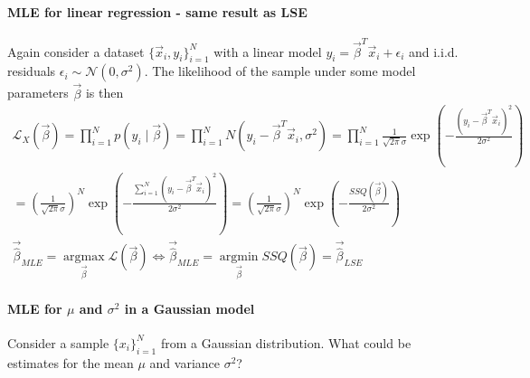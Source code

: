 \paragraph*{MLE for linear regression - same result as LSE} Again consider a dataset $\{ \vec{x}_i,y_i \}_{i=1}^N$
with a linear model $y_i = \vec{\beta}^T \vec{x}_i + \epsilon_i$ and i.i.d. residuals $\epsilon_i \sim \mathcal{N}(0,\sigma^2)$.
The likelihood of the sample under some model parameters $\vec{\beta}$ is then
\begin{equation}
    \begin{gathered}
    \mathcal{L}_X(\vec{\beta})=\prod_{i=1}^N p\left(y_i \mid \vec{\beta}\right)=\prod_{i=1}^N N\left(y_i-\vec{\beta}^T \vec{x}_i, \sigma^2\right)=\prod_{i=1}^N \frac{1}{\sqrt{2 \pi} \sigma} \exp \left(-\frac{\left(y_i-\vec{\beta}^T \vec{x}_i\right)^2}{2 \sigma^2}\right) \\
    =\left(\frac{1}{\sqrt{2 \pi} \sigma}\right)^N \exp \left(-\frac{\sum_{i=1}^N\left(y_i-\vec{\beta}^T \vec{x}_i\right)^2}{2 \sigma^2}\right)=\left(\frac{1}{\sqrt{2 \pi} \sigma}\right)^N \exp \left(-\frac{S S Q(\vec{\beta})}{2 \sigma^2}\right) \\
    \vec{\hat{\beta}}_{M L E}=\underset{\vec{\beta}}{\operatorname{argmax}} \mathcal{L}(\vec{\beta}) \Leftrightarrow \vec{\hat{\beta}}_{M L E}=\underset{\vec{\beta}}{\operatorname{argmin}} S S Q(\vec{\beta})=\vec{\hat{\beta}}_{L S E}
    \end{gathered}
\end{equation}

\paragraph*{MLE for $\mu$ and $\sigma^2$ in a Gaussian model} Consider a sample $\{ x_i \}_{i=1}^N$ from a Gaussian distribution.
What could be estimates for the mean $\mu$ and variance $\sigma^2$?

